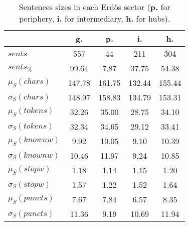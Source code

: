 \begin{table}[h!]
\begin{center}
\begin{tabular}{| l || c | c | c | c |}\hline
 & {\bf g.} & {\bf p.} & {\bf i.} & {\bf h.} \\\hline\hline
$sents$ & 557  & 44  & 211  & 304 \\
$sents_{\%}$ & 99.64  & 7.87  & 37.75  & 54.38 \\\hline
$\mu_S(chars)$ & 147.78  & 161.75  & 132.44  & 155.44 \\
$\sigma_S(chars)$ & 148.97  & 158.83  & 134.79  & 153.31 \\\hline
$\mu_S(tokens)$ & 32.26  & 35.00  & 28.75  & 34.10 \\
$\sigma_S(tokens)$ & 32.34  & 34.65  & 29.12  & 33.41 \\\hline
$\mu_S(knownw)$ & 9.92  & 10.05  & 9.10  & 10.39 \\
$\sigma_S(knownw)$ & 10.46  & 11.97  & 9.24  & 10.85 \\\hline
$\mu_S(stopw)$ & 1.18  & 1.14  & 1.15  & 1.20 \\
$\sigma_S(stopw)$ & 1.57  & 1.22  & 1.52  & 1.64 \\\hline
$\mu_S(puncts)$ & 7.67  & 7.84  & 6.57  & 8.35 \\
$\sigma_S(puncts)$ & 11.36  & 9.19  & 10.69  & 11.94 \\\hline
\end{tabular}
\caption{Sentences sizes in each Erd\"os sector ({{\bf p.}} for periphery, {{\bf i.}} for intermediary, {{\bf h.}} for hubs).}
\end{center}
\end{table}
